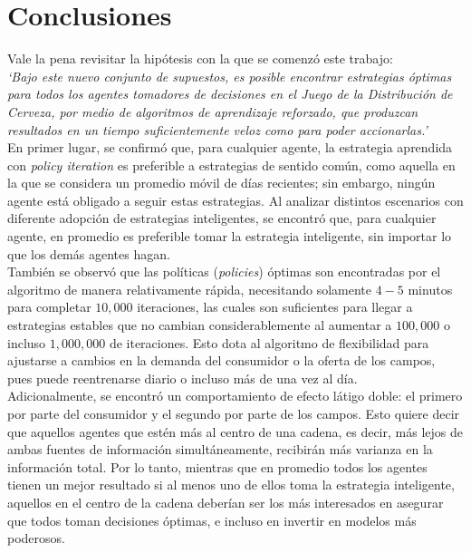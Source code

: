\chapter{Conclusiones}

Vale la pena revisitar la hip\'otesis con la que se comenz\'o este trabajo:\\

\textit{`Bajo este nuevo conjunto de supuestos, es posible encontrar estrategias \'optimas para todos los agentes tomadores de decisiones en el Juego de la Distribuci\'on de Cerveza, por medio de algoritmos de aprendizaje reforzado, que produzcan resultados en un tiempo suficientemente veloz como para poder accionarlas.'}\\

En primer lugar, se confirm\'o que, para cualquier agente, la estrategia aprendida con \textit{policy iteration} es preferible a estrategias de sentido com\'un, como aquella en la que se considera un promedio m\'ovil de d\'ias recientes; sin embargo, ning\'un agente est\'a obligado a seguir estas estrategias. Al analizar distintos escenarios con diferente adopci\'on de estrategias inteligentes, se encontr\'o que, para cualquier agente, en promedio es preferible tomar la estrategia inteligente, sin importar lo que los dem\'as agentes hagan.\\

Tambi\'en se observ\'o que las pol\'iticas (\textit{policies}) \'optimas son encontradas por el algoritmo de manera relativamente r\'apida, necesitando solamente $4-5$ minutos para completar $10,000$ iteraciones, las cuales son suficientes para llegar a estrategias estables que no cambian considerablemente al aumentar a $100,000$ o incluso $1,000,000$ de iteraciones. Esto dota al algoritmo de flexibilidad para ajustarse a cambios en la demanda del consumidor o la oferta de los campos, pues puede reentrenarse diario o incluso m\'as de una vez al d\'ia.\\

Adicionalmente, se encontr\'o un comportamiento de efecto l\'atigo doble: el primero por parte del consumidor y el segundo por parte de los campos. Esto quiere decir que aquellos agentes que est\'en m\'as al centro de una cadena, es decir, m\'as lejos de ambas fuentes de informaci\'on simult\'aneamente, recibir\'an m\'as varianza en la informaci\'on total. Por lo tanto, mientras que en promedio todos los agentes tienen un mejor resultado si al menos uno de ellos toma la estrategia inteligente, aquellos en el centro de la cadena deber\'ian ser los m\'as interesados en asegurar que todos toman decisiones \'optimas, e incluso en invertir en modelos m\'as poderosos.\\

